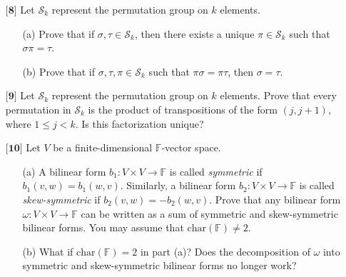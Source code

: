 \documentclass[12pt]{article}
\begin{document}
\begin{itemize}
    \vspace{.5cm}
    \item[$\textbf{[8]}$]
    Let $\mathcal{S}_k$ represent the permutation group on $k$ elements. 
    \begin{itemize}
    
    \vspace{.3cm}
    \item[(a)]
    Prove that if $\sigma,\tau \in \mathcal{S}_k$, then there exists a unique $\pi \in \mathcal{S}_k$ such that $\sigma\pi = \tau$. 
    
    \vspace{.3cm}
    \item[(b)]
    Prove that if $\sigma,\tau,\pi \in \mathcal{S}_k$ such that $\pi\sigma = \pi\tau$, then $\sigma = \tau$. 
    
    \end{itemize}
    
    \vspace{.5cm}
    \item[$\textbf{[9]}$]
    Let $\mathcal{S}_k$ represent the permutation group on $k$ elements. Prove that every permutation in $\mathcal{S}_k$ is the product of transpositions of the form $(j,j+1)$, where $1 \leq j < k$. Is this factorization unique?
    
    \newpage
    \item[$\textbf{[10]}$]
    Let $V$ be a finite-dimensional $\mathbb{F}$-vector space.
    \begin{itemize}
    
    \vspace{.3cm}
    \item[(a)]
    A bilinear form $b_1: V \times V \rightarrow \mathbb{F}$ is called \textit{symmetric} if $b_1(v,w) = b_1(w,v)$. Similarly, a bilinear form $b_2: V \times V \rightarrow \mathbb{F}$ is called \textit{skew-symmetric} if $b_2(v,w) = -b_2(w,v)$. Prove that any bilinear form $\omega: V \times V \rightarrow \mathbb{F}$ can be written as a sum of symmetric and skew-symmetric bilinear forms. You may assume that $\text{char}(\mathbb{F}) \neq 2$.
    
    \vspace{.3cm}
    \item[(b)]
    What if $\text{char}(\mathbb{F}) = 2$ in part (a)? Does the decomposition of $\omega$ into symmetric and skew-symmetric bilinear forms no longer work?
    

\end{itemize}
\end{itemize}
\end{document}
